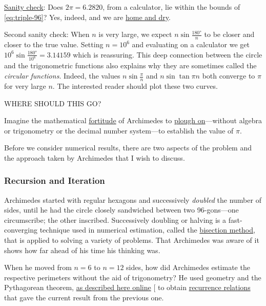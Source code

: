 \documentclass[
  a4paper,
]{article}
\begin{document}
\href{https://en.wiktionary.org/wiki/sanity_check}{Sanity check}: Does
\(2\pi = 6.2820\), from a calculator, lie within the bounds of
\cref{eq:triple-96}? Yes, indeed, and we are
\href{https://dictionary.cambridge.org/dictionary/english/be-home-and-dry}{home
and dry}.

Second sanity check: When \(n\) is very large, we expect
\(n\sin\frac{180°}{n}\) to be closer and closer to the true value.
Setting \(n = 10^6\) and evaluating on a calculator we get
\(10^6\sin\frac{180°}{10^6} = 3.14159\) which is reassuring. This deep
connection between the circle and the trigonometric functions also
explains why they are sometimes called the \emph{circular functions}.
Indeed, the values \(n\sin\frac{\pi}{n}\) and \(n\sin\tan{\pi}{n}\) both
converge to \(\pi\) for very large \(n\). The interested reader should
plot these two curves.

WHERE SHOULD THIS GO?

Imagine the mathematical
\href{https://www.merriam-webster.com/word-of-the-day/fortitude-2019-11-21}{fortitude}
of Archimedes to
\href{https://www.collinsdictionary.com/dictionary/english/plough-on}{plough
on}---without algebra or trigonometry or the decimal number system---to
establish the value of \(\pi\).

Before we consider numerical results, there are two aspects of the
problem and the approach taken by Archimedes that I wish to discuss.

\subsubsection{Recursion and Iteration}\label{recursion-and-iteration}

Archimedes started with regular hexagons and successively \emph{doubled}
the number of sides, until he had the circle closely sandwiched between
two 96-gons---one circumscribe; the other inscribed. Successively
doubling or halving is a fast-converging technique used in numerical
estimation, called the
\href{https://en.wikipedia.org/wiki/Bisection_method}{bisection method},
that is applied to solving a variety of problems. That Archimedes was
aware of it shows how far ahead of his time his thinking was.

When he moved from \(n=6\) to \(n = 12\) sides, how did Archimedes
estimate the respective perimeters without the aid of trigonometry? He
used geometry and the Pythagorean theorem,
\href{https://nonagon.org/ExLibris/archimedes-pi}{as described here
online} {[}\citeproc{ref-bertrand2014}{3}{]} to obtain
\href{https://en.wikipedia.org/wiki/Recurrence_relation}{recurrence
relations} that gave the current result from the previous one.
\end{document}
